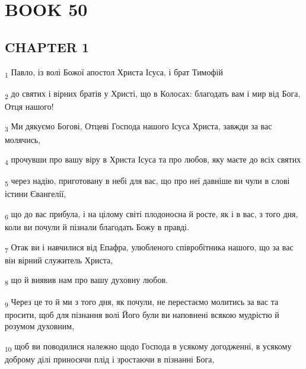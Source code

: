 \section{BOOK 50}
\subsection{CHAPTER 1}
\begin{tcolorbox}
\textsubscript{1} Павло, із волі Божої апостол Христа Ісуса, і брат Тимофій
\end{tcolorbox}
\begin{tcolorbox}
\textsubscript{2} до святих і вірних братів у Христі, що в Колосах: благодать вам і мир від Бога, Отця нашого!
\end{tcolorbox}
\begin{tcolorbox}
\textsubscript{3} Ми дякуємо Богові, Отцеві Господа нашого Ісуса Христа, завжди за вас молячись,
\end{tcolorbox}
\begin{tcolorbox}
\textsubscript{4} прочувши про вашу віру в Христа Ісуса та про любов, яку маєте до всіх святих
\end{tcolorbox}
\begin{tcolorbox}
\textsubscript{5} через надію, приготовану в небі для вас, що про неї давніше ви чули в слові істини Євангелії,
\end{tcolorbox}
\begin{tcolorbox}
\textsubscript{6} що до вас прибула, і на цілому світі плодоносна й росте, як і в вас, з того дня, коли ви почули й пізнали благодать Божу в правді.
\end{tcolorbox}
\begin{tcolorbox}
\textsubscript{7} Отак ви і навчилися від Епафра, улюбленого співробітника нашого, що за вас він вірний служитель Христа,
\end{tcolorbox}
\begin{tcolorbox}
\textsubscript{8} що й виявив нам про вашу духовну любов.
\end{tcolorbox}
\begin{tcolorbox}
\textsubscript{9} Через це то й ми з того дня, як почули, не перестаємо молитись за вас та просити, щоб для пізнання волі Його були ви наповнені всякою мудрістю й розумом духовним,
\end{tcolorbox}
\begin{tcolorbox}
\textsubscript{10} щоб ви поводилися належно щодо Господа в усякому догодженні, в усякому доброму ділі приносячи плід і зростаючи в пізнанні Бога,
\end{tcolorbox}
